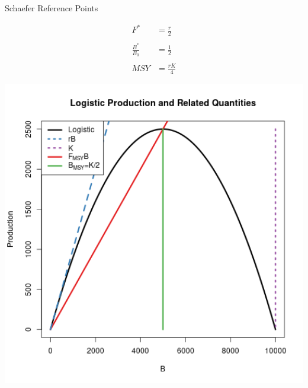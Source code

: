 \documentclass[ xcolor = pdftex, dvipsnames, table ]{beamer}
\begin{document}
%
\begin{frame}{Schaefer Reference Points}
\begin{minipage}[h!]{0.44\textwidth}
\begin{align*}
        F^* &= \frac{r}{2}\\
	~\\
        \frac{B^*}{B_0}&= \frac{1}{2}\\
	~\\
        MSY &= \frac{rK}{4} 
\end{align*}
\end{minipage}
\begin{minipage}[h!]{0.54\textwidth}
\includegraphics[width=1\textwidth]{../plots/srrSchaefferRPplus.png}
\end{minipage}
\end{frame}
\end{document}
